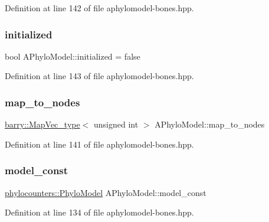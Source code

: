 Definition at line 142 of file aphylomodel-\/bones.\+hpp.

\mbox{\label{class_a_phylo_model_a298c38ef857994159589a6c0f7578150}} 
\subsubsection{\texorpdfstring{initialized}{initialized}}
{\footnotesize\ttfamily bool A\+Phylo\+Model\+::initialized = false}



Definition at line 143 of file aphylomodel-\/bones.\+hpp.

\mbox{\label{class_a_phylo_model_ae041cf2aa3630fab0a050e176c9317f9}} 
\subsubsection{\texorpdfstring{map\+\_\+to\+\_\+nodes}{map\_to\_nodes}}
{\footnotesize\ttfamily \hyperlink{namespacebarry_a2f0d3aab1d67e4c8eaeab9022e16139f}{barry\+::\+Map\+Vec\+\_\+type}$<$ unsigned int $>$ A\+Phylo\+Model\+::map\+\_\+to\+\_\+nodes}



Definition at line 141 of file aphylomodel-\/bones.\+hpp.

\mbox{\label{class_a_phylo_model_ad91e946cad1e96aa444b586921d1ebe6}} 
\subsubsection{\texorpdfstring{model\+\_\+const}{model\_const}}
{\footnotesize\ttfamily \hyperlink{namespacebarry_1_1counters_1_1phylo_ad32b4186e3bab93119df225fddc3c609}{phylocounters\+::\+Phylo\+Model} A\+Phylo\+Model\+::model\+\_\+const}



Definition at line 134 of file aphylomodel-\/bones.\+hpp.

